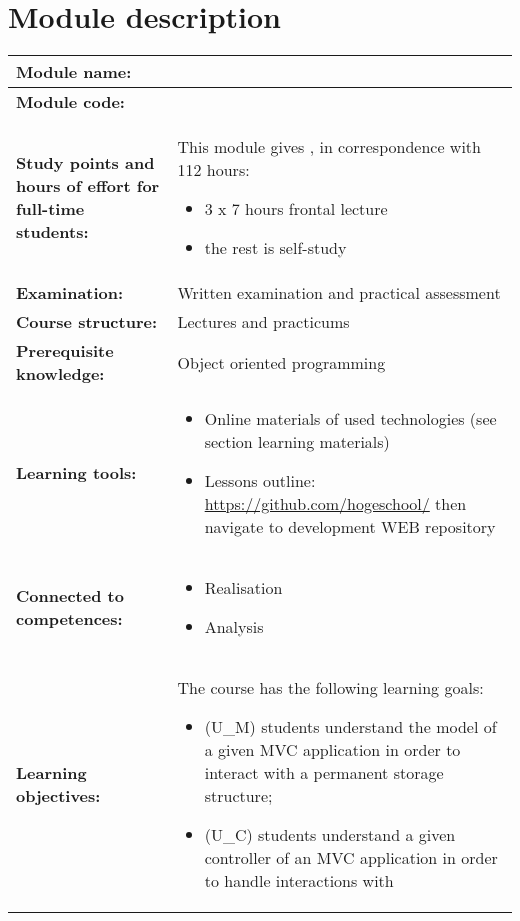 \section*{Module description}
\begin{tabularx}{\textwidth}{|>{\columncolor{lichtGrijs}} p{}|X|}
	\hline
	\textbf{Module name:} & \modulenaam\\
	\hline
	\textbf{Module code: }& \modulecode\\
	\hline
	\textbf{Study points \newline and hours of effort for full-time students:} & This module gives \stdPunten, in correspondence with 112 hours:
	\begin{itemize}
		\item 3 x 7 hours frontal lecture
		\item the rest is self-study
	\end{itemize} \\
	\hline
	\textbf{Examination:} & Written examination and practical assessment \\
	\hline
	\textbf{Course structure:} & Lectures and practicums\\
	\hline
	\textbf{Prerequisite knowledge:} & Object oriented programming \\
	\hline
	\textbf{Learning tools:} & \begin{itemize}
			\item  Online materials of used technologies (see section learning materials) 
			\item  Lessons outline: 
  \url{https://github.com/hogeschool/} then navigate to development WEB repository
		\end{itemize} \\
	\hline
	\textbf{Connected to \newline competences:} & \begin{itemize}
			\item Realisation
			\item Analysis
		\end{itemize} \\
	\hline
	\textbf{Learning objectives:} &
		The course has the following learning goals: 
			\begin{itemize}
					\item (U\_M) students understand the model of a given MVC application in order to interact with a permanent storage structure; 
					\item (U\_C) students understand a given controller of an MVC application in order to handle interactions with

\end{itemize}
\end{tabularx}
